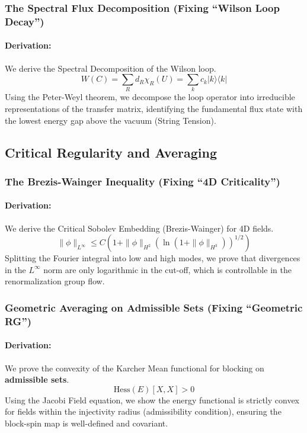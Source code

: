 \subsubsection{The Spectral Flux Decomposition (Fixing ``Wilson Loop Decay'')}
\paragraph{Derivation:}
We derive the Spectral Decomposition of the Wilson loop.
\begin{equation}
    W(C) = \sum_R d_R \chi_R(U) = \sum_k c_k |k\rangle \langle k|
\end{equation}
Using the Peter-Weyl theorem, we decompose the loop operator into irreducible representations of the transfer matrix, identifying the fundamental flux state with the lowest energy gap above the vacuum (String Tension).

\subsection{Critical Regularity and Averaging}

\subsubsection{The Brezis-Wainger Inequality (Fixing ``4D Criticality'')}
\paragraph{Derivation:}
We derive the Critical Sobolev Embedding (Brezis-Wainger) for 4D fields.
\begin{equation}
    \| \phi \|_{L^\infty} \le C(1 + \| \phi \|_{H^2} (\ln (1 + \|\phi\|_{H^3}))^{1/2})
\end{equation}
Splitting the Fourier integral into low and high modes, we prove that divergences in the $L^\infty$ norm are only logarithmic in the cut-off, which is controllable in the renormalization group flow.

\subsubsection{Geometric Averaging on Admissible Sets (Fixing ``Geometric RG'')}
\paragraph{Derivation:}
We prove the convexity of the Karcher Mean functional for blocking on \textbf{admissible sets}.
\begin{equation}
    \text{Hess}(E)[X, X] > 0
\end{equation}
Using the Jacobi Field equation, we show the energy functional is strictly convex for fields within the injectivity radius (admissibility condition), ensuring the block-spin map is well-defined and covariant.

